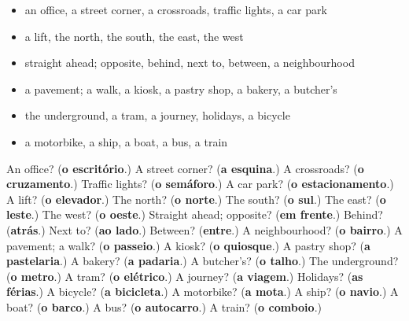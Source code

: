 \begin{itemize}
\raggedright
  \item an office, a street corner, a crossroads, traffic lights, a car park
  \item a lift, the north, the south, the east, the west
  \item straight ahead; opposite, behind, next to, between, a neighbourhood
  \item a pavement; a walk, a kiosk, a pastry shop, a bakery, a butcher's
  \item the underground, a tram, a journey, holidays, a bicycle
  \item a motorbike, a ship, a boat, a bus, a train
\end{itemize}

\begin{tcolorbox}[breakable,colback=teal!4,colframe=teal!35!black,title={Before you move on}]
An office? (\textbf{o escritório}.) A street corner? (\textbf{a esquina}.) A crossroads? (\textbf{o cruzamento}.) Traffic lights? (\textbf{o semáforo}.) A car park? (\textbf{o estacionamento}.) A lift? (\textbf{o elevador}.) The north? (\textbf{o norte}.) The south? (\textbf{o sul}.) The east? (\textbf{o leste}.) The west? (\textbf{o oeste}.) Straight ahead; opposite? (\textbf{em frente}.) Behind? (\textbf{atrás}.) Next to? (\textbf{ao lado}.) Between? (\textbf{entre}.) A neighbourhood? (\textbf{o bairro}.) A pavement; a walk? (\textbf{o passeio}.) A kiosk? (\textbf{o quiosque}.) A pastry shop? (\textbf{a pastelaria}.) A bakery? (\textbf{a padaria}.) A butcher's? (\textbf{o talho}.) The underground? (\textbf{o metro}.) A tram? (\textbf{o elétrico}.) A journey? (\textbf{a viagem}.) Holidays? (\textbf{as férias}.) A bicycle? (\textbf{a bicicleta}.) A motorbike? (\textbf{a mota}.) A ship? (\textbf{o navio}.) A boat? (\textbf{o barco}.) A bus? (\textbf{o autocarro}.) A train? (\textbf{o comboio}.)
\end{tcolorbox}
